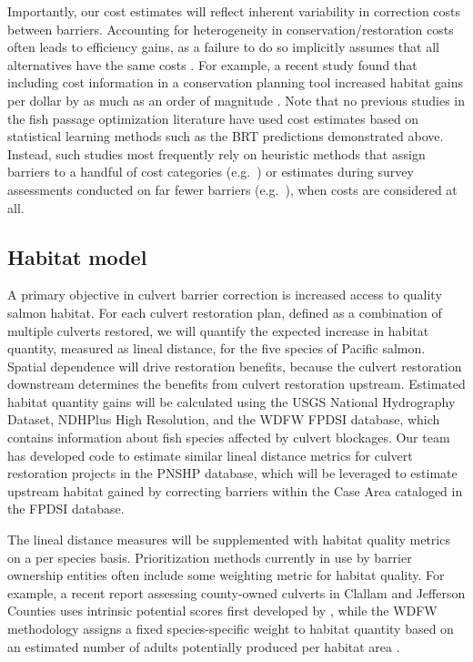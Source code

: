 \documentclass[12pt]{elsarticle}
\begin{document}
Importantly, our cost estimates will reflect inherent variability in correction costs between barriers. Accounting for heterogeneity in conservation/restoration costs often leads to efficiency gains, as a failure to do so implicitly assumes that all alternatives have the same costs \citep{babcock_targeting_1997,naidoo_integrating_2006}. For example, a recent study found that including cost information in a conservation planning tool increased habitat gains per dollar by as much as an order of magnitude \citep{field_quantifying_2019}. Note that no previous studies in the fish passage optimization literature have used cost estimates based on statistical learning methods such as the BRT predictions demonstrated above. Instead, such studies most frequently rely on heuristic methods that assign barriers to a handful of cost categories (e.g.\ \cite{hermoso_accessible_2021}) or estimates during survey assessments conducted on far fewer barriers (e.g.\ \citep{ohanley_restoring_2013,king_toolkit_2017}), when costs are considered at all. 

\subsection*{Habitat model}

A primary objective in culvert barrier correction is increased access to quality salmon habitat. For each culvert restoration plan, defined as a combination of multiple culverts restored, we will quantify the expected increase in habitat quantity, measured as lineal distance, for the five species of Pacific salmon. Spatial dependence will drive restoration benefits, because the culvert restoration downstream determines the benefits from culvert restoration upstream. Estimated habitat quantity gains will be calculated using the USGS National Hydrography Dataset, NDHPlus High Resolution, and the WDFW FPDSI database, which contains information about fish species affected by culvert blockages. Our team has developed code to estimate similar lineal distance metrics for culvert restoration projects in the PNSHP database, which will be leveraged to estimate upstream habitat gained by correcting barriers within the Case Area cataloged in the FPDSI database. 

The lineal distance measures will be supplemented with habitat quality metrics on a per species basis. Prioritization methods currently in use by barrier ownership entities often include some weighting metric for habitat quality. For example, a recent report assessing county-owned culverts in Clallam and Jefferson Counties uses intrinsic potential scores first developed by \cite{burnett_distribution_2007}, while the WDFW methodology assigns a fixed species-specific weight to habitat quantity based on an estimated number of adults potentially produced per habitat area \cite{noauthor_fish_2019}.
\end{document}
